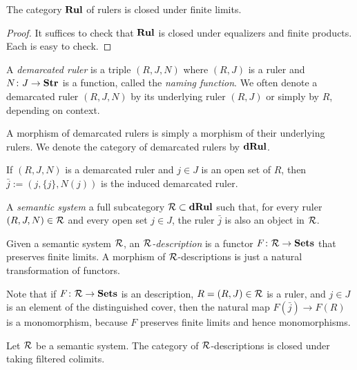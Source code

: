 \documentclass{amsart}
\def\Rul{{\bf Rul}}
\def\dRul{{\bf dRul}}
\def\j{\bar{j}}
\def\Str{{\bf Str}}
\begin{document}
\begin{lemma}

The category $\Rul$ of rulers is closed under finite limits.  

\end{lemma}

\begin{proof}

It suffices to check that $\Rul$ is closed under equalizers and finite products.  Each is easy to check.

\end{proof}

\begin{definition}

A {\em demarcated ruler} is a triple $(R,J,N)$ where $(R,J)$ is a ruler and $N\taking J\to\Str$ is a function, called the {\em naming function}.  We often denote a demarcated ruler $(R,J,N)$ by its underlying ruler $(R,J)$ or simply by $R$, depending on context.

A morphism of demarcated rulers is simply a morphism of their underlying rulers.  We denote the category of demarcated rulers by $\dRul$.

\end{definition}

If $(R,J,N)$ is a demarcated ruler and $j\in J$ is an open set of $R$, then $\j:=(j,\{j\},N(j))$ is the induced demarcated ruler.

\begin{definition}

A {\em semantic system} a full subcategory $\mcR\ss\dRul$ such that, for every ruler $(R,J,N)\in\mathcal{R}$ and every open set $j\in J$, the ruler $\j$ is also an object in $\mathcal{R}$.  

Given a semantic system $\mathcal{R}$, an {\em $\mathcal{R}$-description} is a functor $F\colon\mathcal{R}\rightarrow{\bf Sets}$ that preserves finite limits.  A morphism of $\mathcal{R}$-descriptions is just a natural transformation of functors.

\end{definition}

Note that if $F\colon\mathcal{R}\rightarrow{\bf Sets}$ is an description, $R=(R,J)\in\mathcal{R}$ is a ruler, and $j\in J$ is an element of the distinguished cover, then the natural map $F(\bar{j})\to F(R)$ is a monomorphism, because $F$ preserves finite limits and hence monomorphisms.

\begin{lemma}

Let $\mathcal{R}$ be a semantic system.  The category of $\mathcal{R}$-descriptions is closed under taking filtered colimits.

\end{lemma}
\end{document}

